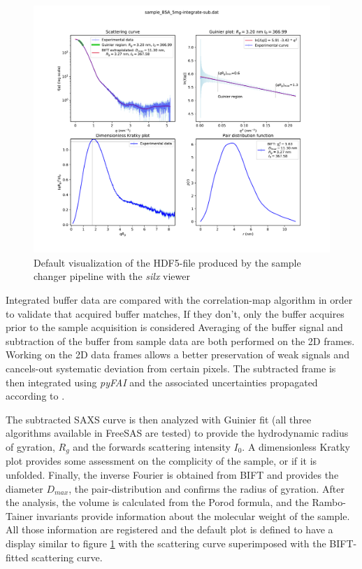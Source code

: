 \documentclass[preprint]{iucr}              %
\begin{document}
\begin{figure}
\label{subtracted}
\begin{center}
\includegraphics{Figure_1}
\caption{Default visualization of the HDF5-file produced by the sample changer pipeline with the \textit{silx} viewer}
\end{center}
\end{figure}


Integrated buffer data are compared with the correlation-map algorithm in order to validate that acquired buffer matches, 
If they don't, only the buffer acquires prior to the sample acquisition is considered
Averaging of the buffer signal and subtraction of the buffer from sample data are both performed on the 
2D frames. 
Working on the 2D data frames allows a better preservation of weak signals and cancels-out systematic deviation
from certain pixels.
The subtracted frame is then integrated using \textit{pyFAI} and the associated uncertainties propagated according to \cite{pyfai_2020}.

The subtracted SAXS curve is then analyzed with Guinier fit (all three algorithms available in FreeSAS are tested)
to provide the hydrodynamic radius of gyration, $R_g$ and the forwards scattering intensity $I_0$.
A dimensionless Kratky plot provides some assessment on the complicity of the sample,  or if it is unfolded. 
Finally, the inverse Fourier is obtained from BIFT and provides the diameter $D_{max}$, the pair-distribution 
and confirms the radius of gyration.
After the analysis, the volume is calculated from the Porod formula, and the Rambo-Tainer invariants provide 
information about the molecular weight of the sample.
All those information are registered and the default plot is defined to have a display similar to figure \ref{subtracted}
with the scattering curve superimposed with the BIFT-fitted scattering curve.
\end{document}
